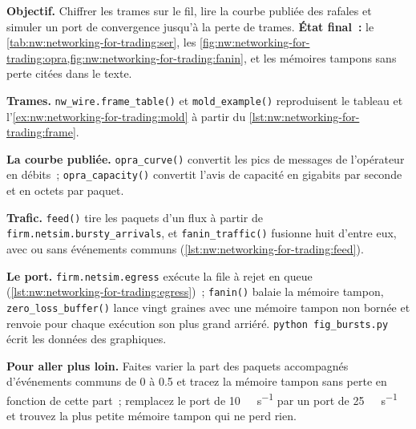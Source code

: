 \begin{tutorial}
\textbf{Objectif.} Chiffrer les trames sur le fil, lire la courbe publiée des rafales et simuler un port de convergence jusqu'à la perte de trames.
\textbf{État final~:} le \cref{tab:nw:networking-for-trading:ser}, les \cref{fig:nw:networking-for-trading:opra,fig:nw:networking-for-trading:fanin},
et les mémoires tampons sans perte citées dans le texte.
\begin{tutsteps}
\item \textbf{Trames.} \texttt{nw\_wire.frame\_table()} et \texttt{mold\_example()} reproduisent le tableau et
  l'\cref{ex:nw:networking-for-trading:mold} à partir du \cref{lst:nw:networking-for-trading:frame}.
\item \textbf{La courbe publiée.} \texttt{opra\_curve()} convertit les pics de messages de l'opérateur en débits~; \texttt{opra\_capacity()}
  convertit l'avis de capacité en gigabits par seconde et en octets par paquet.
\item \textbf{Trafic.} \texttt{feed()} tire les paquets d'un flux à partir de \texttt{firm.netsim.bursty\_arrivals}, et
  \texttt{fanin\_traffic()} fusionne huit d'entre eux, avec ou sans événements communs (\cref{lst:nw:networking-for-trading:feed}).
\item \textbf{Le port.} \texttt{firm.netsim.egress} exécute la file à rejet en queue (\cref{lst:nw:networking-for-trading:egress})~;
  \texttt{fanin()} balaie la mémoire tampon, \texttt{zero\_loss\_buffer()} lance vingt graines avec une mémoire tampon non bornée et renvoie pour chaque
  exécution son plus grand arriéré. \texttt{python fig\_bursts.py} écrit les données des graphiques.
\end{tutsteps}
\textbf{Pour aller plus loin.} Faites varier la part des paquets accompagnés d'événements communs de 0 à 0.5 et tracez la mémoire tampon sans perte
en fonction de cette part~; remplacez le port de \qty{10}{\giga\bit\per\second} par un port de \qty{25}{\giga\bit\per\second} et trouvez la plus petite
mémoire tampon qui ne perd rien.
\end{tutorial}

\label{lst:nw:networking-for-trading:feed}

\label{lst:nw:networking-for-trading:egress}

